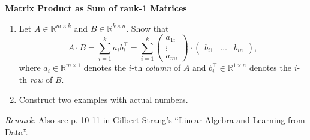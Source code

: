 \textbf{Matrix Product as Sum of rank-1 Matrices}
\begin{enumerate}
	\item Let $A \in \mathbb{R}^{m \times k}$ and $B \in \mathbb{R}^{k \times n}$. Show that 
$$A \cdot B 
= \sum_{i=1}^k a_i b_i^\top
= \sum_{i=1}^k 
\begin{pmatrix}
a_{1i}\\\vdots\\a_{mi}
\end{pmatrix}\cdot\begin{pmatrix}
b_{i1}&\ldots&b_{in}
\end{pmatrix}, $$
where $a_i\in \mathbb{R}^{m\times 1}$ denotes the $i$-th \textit{column} of $A$ and $b_i^\top\in \mathbb{R}^{1 \times n}$ denotes the $i$-th \textit{row} of $B$.
\item Construct two examples with actual numbers.
\end{enumerate}
\textit{Remark:} Also see p. 10-11 in Gilbert Strang's ``Linear Algebra and Learning from Data''.\\
